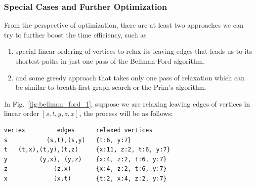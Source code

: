 \documentclass[../main.tex]{subfiles}
\begin{document}
\subsubsection{Special Cases and Further Optimization}
From the perspective of optimization, there are at least two approaches we can try to further boost the time efficiency, such as 
\begin{enumerate}
   \item special linear ordering of vertices to relax its leaving edges that leads us to its shortest-paths in just one pass of the Bellman-Ford algorithm,
    \item and some greedy approach that takes only one pass of relaxation which can be similar to breath-first graph search or the Prim's algorithm.
\end{enumerate}
In Fig.~\ref{fig:bellman_ford_1}, suppose we are relaxing leaving edges of vertices in linear order $[s, t, y, z, x]$, the process will be as follows:
\begin{lstlisting}[numbers=none]
vertex         edges      relaxed vertices
s           (s,t),(s,y)   {t:6, y:7}
t   (t,x),(t,y),(t,z)     {x:11, z:2, t:6, y:7}
y         (y,x), (y,z)    {x:4, z:2, t:6, y:7}
z             (z,x)       {x:4, z:2, t:6, y:7}
x             (x,t)       {t:2, x:4, z:2, y:7}
\end{lstlisting}
\end{document}
